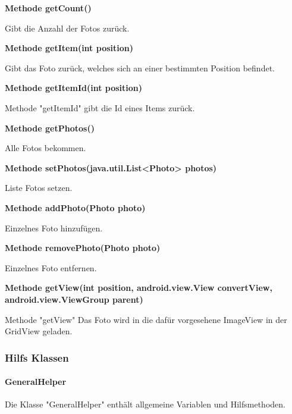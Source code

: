 \documentclass{scrartcl}
\begin{document}
\noindent\textbf{Methode getCount()}

\noindent Gibt die Anzahl der Fotos zurück. \newline 

\noindent\textbf{Methode getItem(int position)}

\noindent Gibt das Foto zurück, welches sich an einer bestimmten Position befindet. \newline 

\noindent\textbf{Methode getItemId(int position)}

\noindent Methode "getItemId" gibt die Id eines Items zurück. \newline 

\noindent\textbf{Methode getPhotos()}

\noindent Alle Fotos bekommen. \newline 

\noindent\textbf{Methode setPhotos(java.util.List<Photo> photos)}

\noindent Liste Fotos setzen. \newline 

\noindent\textbf{Methode addPhoto(Photo photo)}

\noindent Einzelnes Foto hinzufügen. \newline 

\noindent\textbf{Methode removePhoto(Photo photo)}

\noindent Einzelnes Foto entfernen. \newline 

\noindent\textbf{Methode getView(int position, \newline                              android.view.View convertView, android.view.ViewGroup parent)}

\noindent Methode "getView" Das Foto wird in die dafür vorgesehene ImageView in der GridView geladen. \newline 

\newpage

\subsubsection{Hilfs Klassen}

\paragraph{GeneralHelper}
Die Klasse "GeneralHelper" enthält allgemeine Variablen und Hilfsmethoden. \newline 
\end{document}
